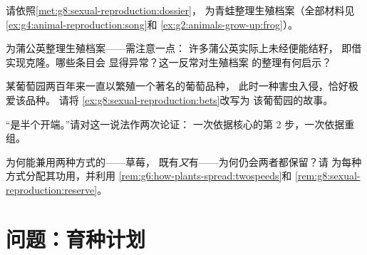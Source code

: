 \begin{exercise}[$\star\star$]\label{exo:g8:sexual-reproduction:8}
请依照\cref{met:g8:sexual-reproduction:dossier}，
为青蛙整理生殖档案（全部材料见
\cref{ex:g4:animal-reproduction:song}和
\cref{ex:g2:animals-grow-up:frog}）。
\end{exercise}

\begin{exercise}[$\star\star$]\label{exo:g8:sexual-reproduction:9}
为蒲公英整理生殖档案——需注意一点：
许多蒲公英实际上未经便能结籽，
即借实现克隆。哪些条目会
显得异常？这一反常对生殖档案
的整理有何启示？
\end{exercise}

\begin{exercise}[$\star\star$]\label{exo:g8:sexual-reproduction:10}
某葡萄园两百年来一直以繁殖一个著名的葡萄品种，
此时一种害虫入侵，恰好极爱该品种。
请将
\cref{ex:g8:sexual-reproduction:bets}改写为
该葡萄园的故事。
\end{exercise}

\begin{exercise}[$\star\star$]\label{exo:g8:sexual-reproduction:11}
“是半个开端。”请对这一说法作两次论证：
一次依据核心的第 2 步，一次依据重组。
\end{exercise}

\begin{exercise}[$\star\star\star$]\label{exo:g8:sexual-reproduction:12}
为何能兼用两种方式的——草莓，
既有\emph{又}有——为何仍会两者都保留？请
为每种方式分配其功用，并利用
\cref{rem:g6:how-plants-spread:twospeeds}和
\cref{rem:g8:sexual-reproduction:reserve}。
\end{exercise}

\section{问题：育种计划}

